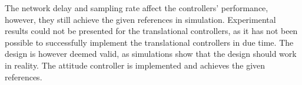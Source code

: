 The network delay and sampling rate affect the controllers' performance, however, they still achieve the given references in simulation. Experimental results could not be presented for the translational controllers, as it has not been possible to successfully implement the translational controllers in due time. The design is however deemed valid, as simulations show that the design should work in reality. The attitude controller is implemented and achieves the given references. 
%
